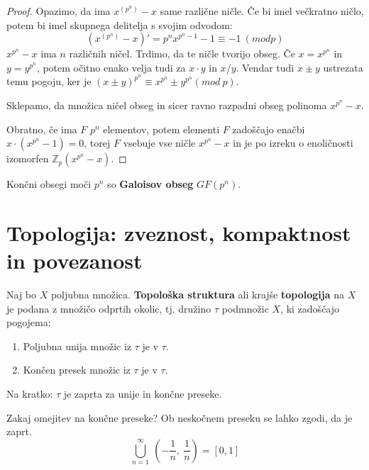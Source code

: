 \documentclass[11pt, a4paper]{article}
\begin{document}
    \begin{proof}
        Opazimo, da ima \(x^{(p^n)} - x\) same različne ničle. Če bi imel večkratno ničlo, potem bi imel skupnega delitelja s svojim odvodom:
        \[(x^{(p^n)} - x)' = p^n x^{p^n - 1} - 1 \equiv -1\ (mod p)\]
        \(x^{p^n} - x\) ima \(n\) različnih ničel. Trdimo, da te ničle tvorijo obseg. Če \(x = x^{p^n}\) in \(y = y^{p^n}\), potem očitno enako velja tudi za \(x \cdot y\) in \(x / y\). Vendar tudi \(x \pm y\) ustrezata temu pogoju, ker je \((x \pm y)^{p^n} \equiv x^{p^n} \pm y^{p^n} (mod\ p)\).
        \par
        Sklepamo, da množica ničel obseg in sicer ravno razpadni obseg polinoma \(x^{p^n} - x\).
        \par
        Obratno, če ima \(F\) \(p^n\) elementov, potem elementi \(F\) zadoščajo enačbi \(x \cdot (x^{p^n} - 1) = 0\), torej \(F\) vsebuje vse ničle \(x^{p^n} - x\) in je po izreku o enoličnosti izomorfen \(\mathbb{Z}_p (x^{p^n} - x)\).
    \end{proof}

    \begin{definition}
        Končni obsegi moči \(p^n\) so \textbf{Galoisov obseg} \(GF(p^n)\).
    \end{definition}




    \pagebreak
    \section{Topologija: zveznost, kompaktnost in povezanost}

    \begin{definition}
        Naj bo \(X\) poljubna množica. \textbf{Topološka struktura} ali krajše \textbf{topologija} na \(X\) je podana z množičo odprtih okolic, tj. družino \(\tau\) podmnožic \(X\), ki zadoščajo pogojema:
        \begin{enumerate}[label=(T\arabic*)]
            \item Poljubna unija množic iz \(\tau\) je v \(\tau\).
            \item Končen presek množic iz \(\tau\) je v \(\tau\). 
        \end{enumerate}

        Na kratko: \(\tau\) je zaprta za unije in končne preseke.
    \end{definition}

    Zakaj omejitev na končne preseke? Ob neskočnem preseku se lahko zgodi, da je zaprt.
    \[ \bigcup_{n=1}^{\infty}\ (-\frac{1}{n},\ \frac{1}{n}) = [0,1] \]
\end{document}
